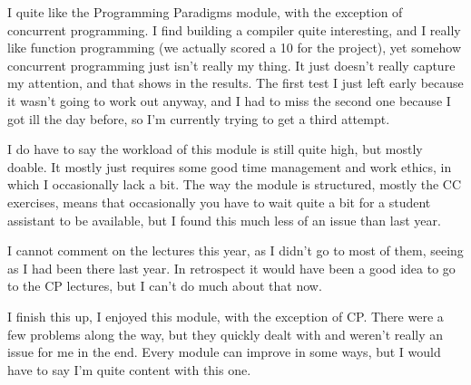 \documentclass[twoside]{report}
\begin{document}
I quite like the Programming Paradigms module, with the exception of concurrent programming. I find building a compiler quite interesting, and I really like function programming (we actually scored a 10 for the project), yet somehow concurrent programming just isn't really my thing. It just doesn't really capture my attention, and that shows in the results. The first test I just left early because it wasn't going to work out anyway, and I had to miss the second one because I got ill the day before, so I'm currently trying to get a third attempt.

I do have to say the workload of this module is still quite high, but mostly doable. It mostly just requires some good time management and work ethics, in which I occasionally lack a bit. The way the module is structured, mostly the CC exercises, means that occasionally you have to wait quite a bit for a student assistant to be available, but I found this much less of an issue than last year.

I cannot comment on the lectures this year, as I didn't go to most of them, seeing as I had been there last year. In retrospect it would have been a good idea to go to the CP lectures, but I can't do much about that now.

I finish this up, I enjoyed this module, with the exception of CP. There were a few problems along the way, but they quickly dealt with and weren't really an issue for me in the end. Every module can improve in some ways, but I would have to say I'm quite content with this one.
\end{document}
